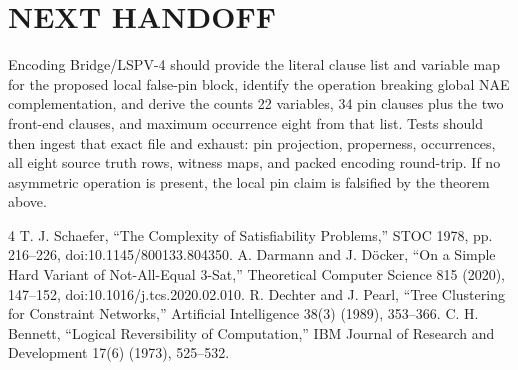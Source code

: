 \documentclass[11pt]{article}
\begin{document}
\section{NEXT HANDOFF}
Encoding Bridge/LSPV-4 should provide the literal clause list and variable map
for the proposed local false-pin block, identify the operation breaking global
NAE complementation, and derive the counts 22 variables, 34 pin clauses plus
the two front-end clauses, and maximum occurrence eight from that list.
Tests should then ingest that exact file and exhaust: pin projection,
properness, occurrences, all eight source truth rows, witness maps, and packed
encoding round-trip.  If no asymmetric operation is present, the local pin
claim is falsified by the theorem above.

\begin{thebibliography}{4}
 T. J. Schaefer, ``The Complexity of Satisfiability
Problems,'' STOC 1978, pp. 216--226, doi:10.1145/800133.804350.
 A. Darmann and J. D\"ocker, ``On a Simple Hard Variant of
Not-All-Equal 3-Sat,'' Theoretical Computer Science 815 (2020), 147--152,
doi:10.1016/j.tcs.2020.02.010.
 R. Dechter and J. Pearl, ``Tree Clustering for Constraint
Networks,'' Artificial Intelligence 38(3) (1989), 353--366.
 C. H. Bennett, ``Logical Reversibility of Computation,''
IBM Journal of Research and Development 17(6) (1973), 525--532.
\end{thebibliography}
\end{document}
